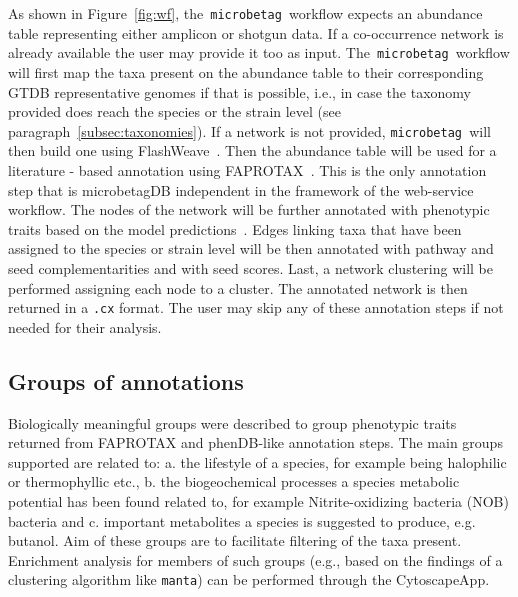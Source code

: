 \documentclass[sn-mathphys,Numbered]{sn-jnl}  %
\theoremstyle{thmstyleone}%
\theoremstyle{thmstyletwo}%
\theoremstyle{thmstylethree}%
\newcommand{\microbetag}{\texttt{microbetag }}
\begin{document}
        As shown in Figure~\ref{fig:wf}, the~\microbetag workflow expects an abundance table representing either amplicon or shotgun data.
        If a co-occurrence network is already available the user may provide it too as input.
        The~\microbetag workflow will first map the taxa present on the abundance table to their corresponding GTDB representative genomes if that is possible, i.e., in case the taxonomy provided does reach the species or the strain level (see paragraph~\ref{subsec:taxonomies}).
        If a network is not provided, \microbetag will then build one using FlashWeave~\cite{flashweave_cite}. 
        Then the abundance table will be used for a literature - based annotation using FAPROTAX~\cite{louca2016decoupling}.
        This is the only annotation step that is microbetagDB independent in the framework of the web-service workflow.
        The nodes of the network will be further annotated with phenotypic traits based on the model predictions~\cite{feldbauer2015prediction}.
        Edges linking taxa that have been assigned to the species or strain level will be then annotated with pathway and seed complementarities and with seed scores.
        Last, a network clustering will be performed assigning each node to a cluster.
        The annotated network is then returned in a \texttt{.cx} format. 
        The user may skip any of these annotation steps if not needed for their analysis.




    \subsection*{Groups of annotations}
    \label{subsec:groups}

        Biologically meaningful groups were described to group phenotypic traits returned from FAPROTAX and phenDB-like annotation steps.
        The main groups supported are related to: 
        a. the lifestyle of a species, for example being halophilic or thermophyllic etc.,
        b. the biogeochemical processes a species metabolic potential has been found related to, for example Nitrite-oxidizing bacteria (NOB) bacteria and 
        c. important metabolites a species is suggested to produce, e.g. butanol.
        Aim of these groups are to facilitate filtering of the taxa present.
        Enrichment analysis for members of such groups 
        (e.g., based on the findings of a clustering algorithm like \texttt{manta}) 
        can be performed through the CytoscapeApp.
\end{document}
